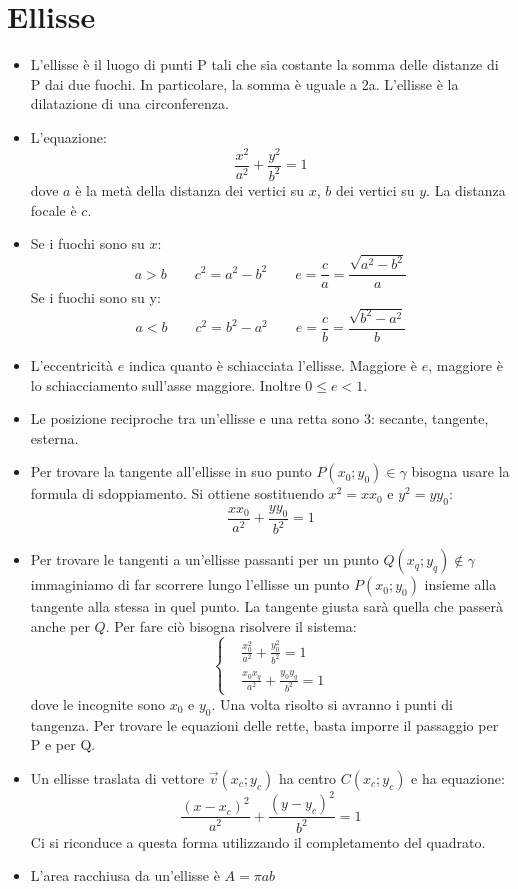 \documentclass[]{article}
\begin{document}
\section{Ellisse}
\begin{itemize}
	\item L'ellisse è il luogo di punti P tali che sia costante la somma delle distanze di P dai due fuochi. In particolare, la somma è uguale a 2a. L'ellisse è la dilatazione di una circonferenza.
	\item L'equazione:
		$$\frac{x^2}{a^2}+\frac{y^2}{b^2}=1$$
		dove $a$ è la metà della distanza dei vertici su $x$, $b$ dei vertici su $y$. La distanza focale è $c$.
	\item Se i fuochi sono su $x$:
		$$ a > b \hspace{2em} c^2 = a^2-b^2 \hspace{2em} e=\frac{c}{a}=\frac{\sqrt{a^2-b^2}}{a}$$
		Se i fuochi sono su y:
		$$ a < b \hspace{2em} c^2 = b^2-a^2 \hspace{2em} e=\frac{c}{b}=\frac{\sqrt{b^2-a^2}}{b}$$
	\item L'eccentricità $e$ indica quanto è schiacciata l'ellisse. Maggiore è $e$, maggiore è lo schiacciamento sull'asse maggiore. Inoltre $0 \le e < 1$.
	\item Le posizione reciproche tra un'ellisse e una retta sono 3: secante, tangente, esterna.
	\item Per trovare la tangente all'ellisse in suo punto $P(x_0;y_0)\in\gamma$ bisogna usare la formula di sdoppiamento. Si ottiene sostituendo $x^2=xx_0$ e $y^2=yy_0$:
		$$\frac{xx_0}{a^2}+\frac{yy_0}{b^2}=1$$
	\item Per trovare le tangenti a un'ellisse passanti per un punto $Q(x_q;y_q)\not\in\gamma$ immaginiamo di far scorrere lungo l'ellisse un punto $P(x_0;y_0)$ insieme alla tangente alla stessa in quel punto. La tangente giusta sarà quella che passerà anche per $Q$. Per fare ciò bisogna risolvere il sistema:
		\begin{equation}
			\left\{
				\begin{aligned}
					&\frac{x_0^2}{a^2}+\frac{y_0^2}{b^2}=1\\
					&\frac{x_0x_q}{a^2}+\frac{y_0y_q}{b^2}=1
				\end{aligned}
			\right.
		\end{equation}
		dove le incognite sono $x_0$ e $y_0$. Una volta risolto si avranno i punti di tangenza. Per trovare le equazioni delle rette, basta imporre il passaggio per P e per Q.
	\item Un ellisse traslata di vettore $\vec{v}(x_c;y_c)$ ha centro $C(x_c;y_c)$ e ha equazione:
		$$\frac{(x-x_c)^2}{a^2}+\frac{(y-y_c)^2}{b^2}=1$$
		Ci si riconduce a questa forma utilizzando il completamento del quadrato.
	\item L'area racchiusa da un'ellisse è $A=\pi ab$
\end{itemize}
\end{document}
